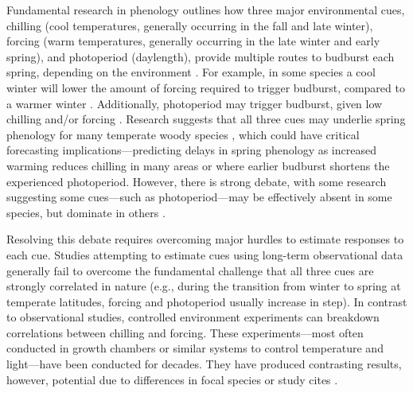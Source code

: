 \documentclass{article}
\begin{document}
\par Fundamental research in phenology outlines how three major environmental cues, chilling (cool temperatures, generally occurring in the fall and late winter), forcing (warm temperatures, generally occurring in the late winter and early spring), and photoperiod (daylength), provide multiple routes to budburst 
each spring, depending on the environment \citep{chuineJTB}. For example, in some species a cool winter will lower the amount of forcing required to trigger budburst, compared to a warmer winter \citep{harrington2015}. Additionally, photoperiod may trigger budburst, given low chilling and/or forcing \citep{Basler:2014aa, Caffarra:2011b, zohner2016}. Research suggests that all three cues may underlie spring phenology for many temperate woody species \citep{flynn2018,Basler:2014aa,Caffarra:2011qf}, which could have critical forecasting implications---predicting delays in spring phenology as increased warming reduces chilling in many areas \citep{fraga2019} or where earlier budburst shortens the experienced photoperiod. However, there is strong debate, with some research suggesting some cues---such as photoperiod---may be effectively absent in some species, but dominate in others \citep{zohner2016,koerner2010a}. 

\par Resolving this debate requires overcoming major hurdles to estimate responses to each cue. Studies attempting to estimate cues using long-term observational data \citep[e.g.,][]{vitasse2013, zohner2016} generally fail to overcome the fundamental challenge that all three cues are strongly correlated in nature (e.g., during the transition from winter to spring at temperate latitudes, forcing and photoperiod usually increase in step). In contrast to observational studies, controlled environment experiments can breakdown correlations between chilling and forcing. These experiments---most often conducted in growth chambers or similar systems to control temperature and light---have been conducted for decades. They have produced contrasting results, however, potential due to differences in focal species or study cites \citep{zohner2016,Laube:2014a,Basler:2012,Caffarra:2011b,Caffarra:2011a}. 

\end{document}
